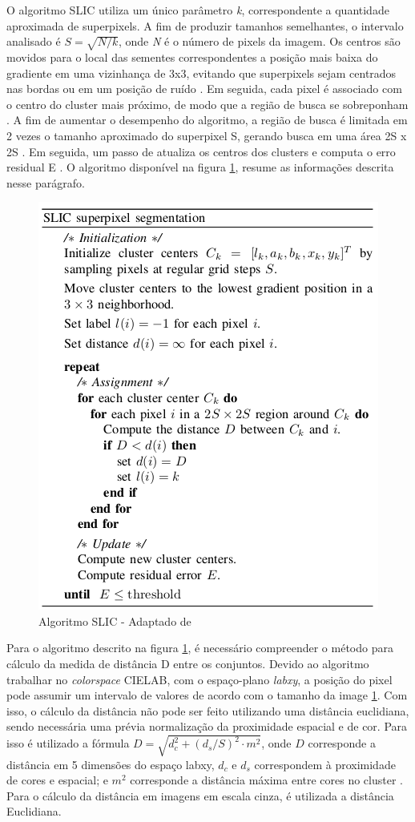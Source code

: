 \begin{document}
O algoritmo SLIC utiliza um único parâmetro \textit{k}, correspondente a quantidade aproximada de superpixels. A fim de produzir tamanhos semelhantes, o intervalo analisado é $S=\sqrt{N/k}$, onde \textit{N} é o número de pixels da imagem. Os centros são movidos para o local das sementes correspondentes a posição mais baixa do gradiente em uma vizinhança de 3x3, evitando que superpixels sejam centrados nas bordas ou em um posição de ruído \cite{SLIC}. Em seguida, 
cada pixel é associado com o centro do cluster mais próximo, de modo que a região de busca se sobreponham \cite{SLIC}. A fim de aumentar o desempenho do algoritmo, a região de busca é limitada em 2 vezes o tamanho aproximado do superpixel S, gerando busca em uma área 2S x 2S \cite{SLIC}. Em seguida, um passo de atualiza os centros dos clusters e computa o erro residual E \cite{SLIC}. O algoritmo disponível na figura \ref{alg:SLIC}, resume as informações descrita nesse parágrafo.

\begin{figure}[ht]
\centering
\includegraphics[width=.6\textwidth]{algoritmo_slic.png}
\caption{Algoritmo SLIC - Adaptado de \cite{SLIC}}
\label{alg:SLIC}
\end{figure}

Para o algoritmo descrito na figura \ref{alg:SLIC}, é necessário compreender o método para cálculo da medida de distância D entre os conjuntos. Devido ao algoritmo trabalhar no \textit{colorspace} CIELAB, com o espaço-plano \textit{labxy}, a posição do pixel pode assumir um intervalo de valores de acordo com o tamanho da image \ref{alg:SLIC}. Com isso, o cálculo da distância não pode ser feito utilizando uma distância euclidiana, sendo necessária uma prévia normalização da proximidade espacial e de cor. Para isso é utilizado a fórmula $D=\sqrt{d_c^2+(d_s/S)^2 \cdot m^2}$, onde $D$ corresponde a distância em 5 dimensões do espaço labxy, $d_c$ e $d_s$ correspondem à proximidade de cores e espacial; e $m^2$ corresponde a distância máxima entre cores no cluster \cite{SLIC}. Para o cálculo da distância em imagens em escala cinza, é utilizada a distância Euclidiana.
\end{document}
